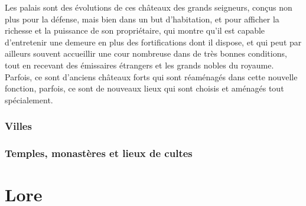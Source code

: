 \documentclass[10pt,a4paper]{book}
\begin{document}
Les palais sont des évolutions de ces châteaux des grands seigneurs, conçus non plus pour la défense, mais bien dans un but d'habitation, et pour afficher la richesse et la puissance de son propriétaire, qui montre qu'il est capable d'entretenir une demeure en plus des fortifications dont il dispose, et qui peut par ailleurs souvent accueillir une cour nombreuse dans de très bonnes conditions, tout en recevant des émissaires étrangers et les grands nobles du royaume. Parfois, ce sont d'anciens châteaux forts qui sont réaménagés dans cette nouvelle fonction, parfois, ce sont de nouveaux lieux qui sont choisis et aménagés tout spécialement.


\subsection{Villes}
\subsection{Temples, monastères et lieux de cultes}

\chapter{Lore}
\end{document}
